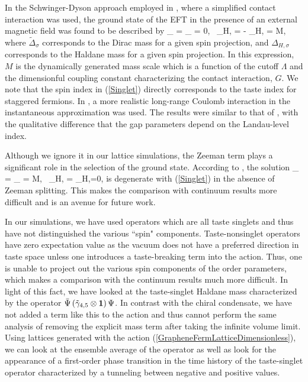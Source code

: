 \documentclass[aps,prd,twocolumn,showpacs,superscriptaddress,groupedaddress]{revtex4}  %
\begin{document}
In the Schwinger-Dyson approach employed in \cite{MiranskyGraphene2}, where a simplified contact interaction was used, the ground state of the EFT in the presence of an external magnetic field was found to be described by
\beq
\label{Singlet}
\tilde{\Delta}_{\uparrow} = \tilde{\Delta}_{\downarrow} = 0, ~\Delta_{H,\uparrow} = - \Delta_{H,\downarrow} = M,
\eeq
where $\tilde{\Delta}_{\sigma}$ corresponds to the Dirac mass for a given spin projection, and $\Delta_{H,\sigma}$ corresponds to the Haldane mass for a given spin projection. In this expression, $M$ is the dynamically generated mass scale which is a function of the cutoff $\Lambda$ and the dimensionful coupling constant characterizing the contact interaction, $G$. We note that the spin index in (\ref{Singlet}) directly corresponds to the taste index for staggered fermions. In \cite{MiranskyGraphene3}, a more realistic long-range Coulomb interaction in the instantaneous approximation was used. The results were similar to that of \cite{MiranskyGraphene2}, with the qualitative difference that the gap parameters depend on the Landau-level index.

Although we ignore it in our lattice simulations, the Zeeman term plays a significant role in the selection of the ground state.  According to \cite{MiranskyGraphene2,MiranskyGraphene3}, the solution 
\beq
\label{Triplet}
\tilde{\Delta}_{\uparrow} = \tilde{\Delta}_{\downarrow} = M, ~\Delta_{H,\uparrow} = \Delta_{H,\downarrow}=0,
\eeq
is degenerate with (\ref{Singlet}) in the absence of Zeeman splitting. This makes the comparison with continuum results more difficult and is an avenue for future work.

In our simulations, we have used operators which are all taste singlets and thus have not distinguished the various ``spin" components. Taste-nonsinglet operators have zero expectation value as the vacuum does not have a preferred direction in taste space unless one introduces a taste-breaking term into the action. Thus, one is unable to project out the various spin components of the order parameters, which makes a comparison with the continuum results much more difficult.  In light of this fact, we have looked at the taste-singlet Haldane mass characterized by the operator ${\bar \Psi} \left(\tilde{\gamma}_{4,5} \otimes \bm 1\right) \Psi$. In contrast with the chiral condensate, we have not added a term like this to the action and thus cannot perform the same analysis of removing the explicit mass term after taking the infinite volume limit. Using lattices generated with the action (\ref{GrapheneFermLatticeDimensionless}), we can look at the ensemble average of the operator as well as look for the appearance of a first-order phase transition in the time history of the taste-singlet operator characterized by a tunneling between negative and positive values. 
\end{document}
